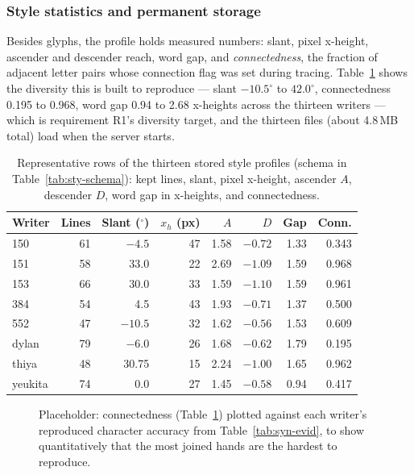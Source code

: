 \subsubsection{Style statistics and permanent storage}
\label{sec:sty-stats}

Besides glyphs, the profile holds measured numbers: slant, pixel x-height, ascender and descender reach, word gap, and \emph{connectedness}, the fraction of adjacent letter pairs whose connection flag was set during tracing. Table~\ref{tab:sty-writers} shows the diversity this is built to reproduce --- slant $-10.5^\circ$ to $42.0^\circ$, connectedness 0.195 to 0.968, word gap 0.94 to 2.68 x-heights across the thirteen writers --- which is requirement R1's diversity target, and the thirteen files (about 4.8\,MB total) load when the server starts.

\begin{table}[!htbp]
\centering
\fontsize{7.5}{9}\selectfont
\setlength{\tabcolsep}{2.5pt}
\begin{tabular}{|l|r|r|r|r|r|r|r|}
\hline
\textbf{Writer} & \textbf{Lines} & \textbf{Slant ($^\circ$)} & \textbf{$x_h$ (px)} & \textbf{$A$} & \textbf{$D$} & \textbf{Gap} & \textbf{Conn.} \\
\hline
150 & 61 & $-4.5$ & 47 & 1.58 & $-0.72$ & 1.33 & 0.343 \\
151 & 58 & 33.0 & 22 & 2.69 & $-1.09$ & 1.59 & 0.968 \\
153 & 66 & 30.0 & 33 & 1.59 & $-1.10$ & 1.59 & 0.961 \\
384 & 54 & 4.5 & 43 & 1.93 & $-0.71$ & 1.37 & 0.500 \\
552 & 47 & $-10.5$ & 32 & 1.62 & $-0.56$ & 1.53 & 0.609 \\
dylan & 79 & $-6.0$ & 26 & 1.68 & $-0.62$ & 1.79 & 0.195 \\
thiya & 48 & 30.75 & 15 & 2.24 & $-1.00$ & 1.65 & 0.962 \\
yeukita & 74 & 0.0 & 27 & 1.45 & $-0.58$ & 0.94 & 0.417 \\
\hline
\end{tabular}
\caption{Representative rows of the thirteen stored style profiles (schema in Table~\ref{tab:sty-schema}): kept lines, slant, pixel x-height, ascender $A$, descender $D$, word gap in x-heights, and connectedness.}
\label{tab:sty-writers}
\end{table}

\begin{figure}[htb]
\centering
{}
\captionsetup{singlelinecheck=false,justification=justified}
\caption{Placeholder: connectedness (Table~\ref{tab:sty-writers}) plotted against each writer's reproduced character accuracy from Table~\ref{tab:syn-evid}, to show quantitatively that the most joined hands are the hardest to reproduce.}
\label{fig:sty-conn-fig}
\end{figure}

